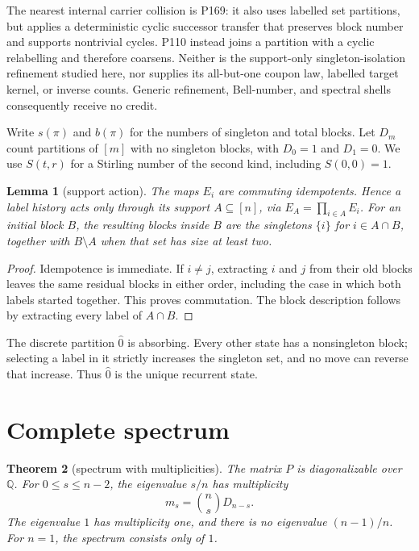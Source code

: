 \documentclass[a4paper,10pt]{amsart}
\newtheorem{theorem}{Theorem}[section]
\newtheorem{lemma}[theorem]{Lemma}
\theoremstyle{remark}
\begin{document}
The nearest internal carrier collision is P169: it also uses labelled set
partitions, but applies a deterministic cyclic successor transfer that
preserves block number and supports nontrivial cycles.  P110 instead joins a
partition with a cyclic relabelling and therefore coarsens.  Neither is the
support-only singleton-isolation refinement studied here, nor supplies its
all-but-one coupon law, labelled target kernel, or inverse counts.  Generic
refinement, Bell-number, and spectral shells consequently receive no credit.

Write $s(\pi)$ and $b(\pi)$ for the numbers of singleton and total blocks.
Let $D_m$ count partitions of $[m]$ with no singleton blocks, with
$D_0=1$ and $D_1=0$.  We use $S(t,r)$ for a Stirling number of the second
kind, including $S(0,0)=1$.

\begin{lemma}[support action]\label{lem:support}
The maps $E_i$ are commuting idempotents.  Hence a label history acts only
through its support $A\subseteq[n]$, via $E_A=\prod_{i\in A}E_i$.
For an initial block $B$, the resulting blocks inside $B$ are the singletons
$\{i\}$ for $i\in A\cap B$, together with $B\setminus A$ when that set has
size at least two.
\end{lemma}

\begin{proof}
Idempotence is immediate.  If $i\ne j$, extracting $i$ and $j$ from their
old blocks leaves the same residual blocks in either order, including the
case in which both labels started together.  This proves commutation.  The
block description follows by extracting every label of $A\cap B$.
\end{proof}

The discrete partition $\widehat 0$ is absorbing.  Every other state has a
nonsingleton block; selecting a label in it strictly increases the singleton
set, and no move can reverse that increase.  Thus $\widehat0$ is the unique
recurrent state.

\section{Complete spectrum}

\begin{theorem}[spectrum with multiplicities]\label{thm:spectrum}
The matrix $P$ is diagonalizable over $\mathbb Q$.  For
$0\le s\le n-2$, the eigenvalue $s/n$ has multiplicity
\begin{equation}\label{eq:mult}
 m_s=\binom ns D_{n-s}.
\end{equation}
The eigenvalue $1$ has multiplicity one, and there is no eigenvalue
$(n-1)/n$.  For $n=1$, the spectrum consists only of $1$.
\end{theorem}
\end{document}
